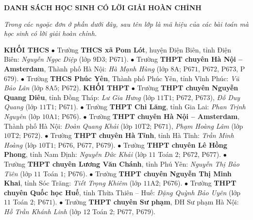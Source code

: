 \begin{center}
	\textbf{\color{thachthuctoanhoc}DANH SÁCH HỌC SINH CÓ LỜI GIẢI HOÀN CHỈNH}
\end{center}
\textit{Trong các ngoặc đơn ở phần dưới đây, sau tên lớp là mã hiệu của các bài toán mà học sinh có lời giải hoàn chỉnh.}
\vskip 0.05cm
\begin{multicols}{2}
	\textbf{\color{thachthuctoanhoc}KHỐI THCS}
	\vskip 0.05cm
	$\bullet$  Trường \textbf{\color{thachthuctoanhoc}THCS xã Pom Lót}, huyện Điện Biên, tỉnh Điện Biên: \textit{Nguyễn Ngọc Diệp} (lớp $9$D$3$; P$671$).
	\vskip 0.05cm
	$\bullet$  Trường \textbf{\color{thachthuctoanhoc}THPT chuyên Hà Nội -- Amsterdam}, Thành phố Hà Nội: \textit{Hà Mạnh Hùng} (lớp $8$A; P$671$, P$672$, P$673$, P$679$).
	\vskip 0.05cm
	$\bullet$  Trường \textbf{\color{thachthuctoanhoc}THCS Phúc Yên}, Thành phố Phúc Yên, tỉnh Vĩnh Phúc: \textit{Vũ Bảo Lân} (lớp $8$A$5$; P$672$).
	\vskip 0.05cm
	\textbf{\color{thachthuctoanhoc}KHỐI THPT}
	\vskip 0.05cm
	$\bullet$  Trường \textbf{\color{thachthuctoanhoc}THPT chuyên Nguyễn Quang Diêu}, tỉnh Đồng Tháp: \textit{Lư Gia Hưng} (lớp $11$T$1$; P$672$, P$673$), \textit{Đỗ Duy Quang} (lớp $11$T$1$; P$671$).
	\vskip 0.05cm
	$\bullet$  Trường \textbf{\color{thachthuctoanhoc}THPT Chi Lăng}, tỉnh Gia Lai: \textit{Phan Trịnh Nguyên} (lớp $10$A$1$; P$676$).
	\vskip 0.05cm
	$\bullet$  Trường \textbf{\color{thachthuctoanhoc}THPT chuyên Hà Nội -- Amsterdam}, Thành phố Hà Nội: \textit{Đoàn Quang Khải} (lớp $10$T$2$; P$671$), \textit{Phạm Hoàng Lâm} (lớp $10$T$2$; P$672$).
	\vskip 0.05cm
	$\bullet$  Trường \textbf{\color{thachthuctoanhoc}THPT chuyên Hà Tĩnh}, tỉnh Hà Tĩnh: \textit{Trần Minh Hoàng} (lớp $10$T$1$; P$676$, P$677$, P$679$).
	\vskip 0.05cm
	$\bullet$  Trường \textbf{\color{thachthuctoanhoc}THPT chuyên Lê Hồng Phong}, tỉnh Nam Định: \textit{Nguyễn Đức Khải} (lớp $11$ Toán $2$; P$672$, P$677$).
	\vskip 0.05cm
	$\bullet$  Trường \textbf{\color{thachthuctoanhoc}THPT chuyên Lương Văn Chánh}, tỉnh Phú Yên: \textit{Nguyễn Thị Bảo Tiên} (lớp $11$ Toán $1$; P$676$).
	\vskip 0.05cm
	$\bullet$  Trường \textbf{\color{thachthuctoanhoc}THPT chuyên Nguyễn Thị Minh Khai}, tỉnh Sóc Trăng: \textit{Tiết Trọng Khiêm} (lớp $11$A$2$; P$676$).
	\vskip 0.05cm
	$\bullet$  Trường \textbf{\color{thachthuctoanhoc}THPT chuyên Quốc học Huế}, tỉnh Thừa Thiên -- Huế: \textit{Đặng Quỳnh Bảo Uyên} (lớp $11$ Toán $2$; P$671$).
	\vskip 0.05cm
	$\bullet$  Trường \textbf{\color{thachthuctoanhoc}THPT chuyên Sư phạm}, ĐH Sư phạm Hà Nội: \textit{Hồ Trần Khánh Linh} (lớp $12$ Toán $2$; P$677$, P$679$).
\end{multicols}